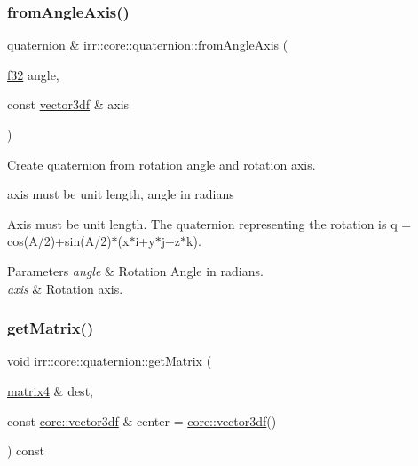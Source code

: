 \subsubsection{\texorpdfstring{from\+Angle\+Axis()}{fromAngleAxis()}}
{\footnotesize\ttfamily \hyperlink{classirr_1_1core_1_1quaternion}{quaternion} \& irr\+::core\+::quaternion\+::from\+Angle\+Axis (\begin{DoxyParamCaption}\item[{\hyperlink{namespaceirr_a0277be98d67dc26ff93b1a6a1d086b07}{f32}}]{angle,  }\item[{const \hyperlink{namespaceirr_1_1core_a06f169d08b5c429f5575acb7edbad811}{vector3df} \&}]{axis }\end{DoxyParamCaption})\hspace{0.3cm}{\ttfamily [inline]}}



Create quaternion from rotation angle and rotation axis. 

axis must be unit length, angle in radians

Axis must be unit length. The quaternion representing the rotation is q = cos(A/2)+sin(A/2)$\ast$(x$\ast$i+y$\ast$j+z$\ast$k). 
\begin{DoxyParams}{Parameters}
{\em angle} & Rotation Angle in radians. \\
\hline
{\em axis} & Rotation axis. \\
\hline
\end{DoxyParams}
\mbox{\label{classirr_1_1core_1_1quaternion_a333ab73cbc2b334ea9f5fe6a5a66058e}} 
\subsubsection{\texorpdfstring{get\+Matrix()}{getMatrix()}}
{\footnotesize\ttfamily void irr\+::core\+::quaternion\+::get\+Matrix (\begin{DoxyParamCaption}\item[{\hyperlink{namespaceirr_1_1core_a73fa92e638c5ca97efd72da307cc9b65}{matrix4} \&}]{dest,  }\item[{const \hyperlink{namespaceirr_1_1core_a06f169d08b5c429f5575acb7edbad811}{core\+::vector3df} \&}]{center = {\ttfamily \hyperlink{namespaceirr_1_1core_a06f169d08b5c429f5575acb7edbad811}{core\+::vector3df}()} }\end{DoxyParamCaption}) const\hspace{0.3cm}{\ttfamily [inline]}}



